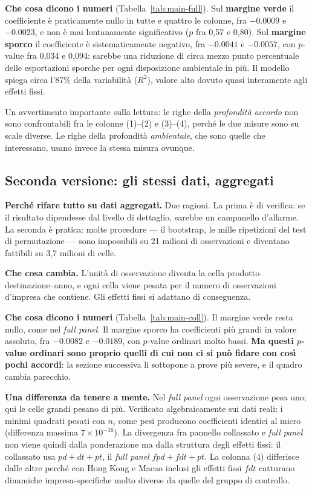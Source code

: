 \documentclass[11pt,a4paper]{article}
\begin{document}
\textbf{Che cosa dicono i numeri} (Tabella~\ref{tab:main-full}). Sul \textbf{margine verde}
il coefficiente \`e praticamente nullo in tutte e quattro le colonne, fra $-0.0009$ e
$-0.0023$, e non \`e mai lontanamente significativo ($p$ fra 0,57 e 0,80). Sul
\textbf{margine sporco} il coefficiente \`e sistematicamente negativo, fra $-0.0041$ e
$-0.0057$, con $p$-value fra 0,034 e 0,094: sarebbe una riduzione di circa mezzo punto
percentuale delle esportazioni sporche per ogni disposizione ambientale in pi\`u.
Il modello spiega circa l'87\% della variabilit\`a ($R^2$), valore alto dovuto quasi
interamente agli effetti fissi.

Un avvertimento importante sulla lettura: le righe della \emph{profondit\`a accordo} non
sono confrontabili fra le colonne (1)--(2) e (3)--(4), perch\'e le due misure sono su
scale diverse. Le righe della profondit\`a \emph{ambientale}, che sono quelle che
interessano, usano invece la stessa misura ovunque.



\clearpage
\subsection{Seconda versione: gli stessi dati, aggregati}

\textbf{Perch\'e rifare tutto su dati aggregati.} Due ragioni. La prima \`e di verifica:
se il risultato dipendesse dal livello di dettaglio, sarebbe un campanello d'allarme. La
seconda \`e pratica: molte procedure --- il bootstrap, le mille ripetizioni del test di
permutazione --- sono impossibili su 21 milioni di osservazioni e diventano fattibili su
3,7 milioni di celle.

\textbf{Che cosa cambia.} L'unit\`a di osservazione diventa la cella
prodotto--destinazione--anno, e ogni cella viene pesata per il numero di osservazioni
d'impresa che contiene. Gli effetti fissi si adattano di conseguenza.

\textbf{Che cosa dicono i numeri} (Tabella~\ref{tab:main-coll}). Il margine verde resta
nullo, come nel \emph{full panel}. Il margine sporco ha coefficienti pi\`u grandi in valore
assoluto, fra $-0.0082$ e $-0.0189$, con $p$-value ordinari molto bassi. \textbf{Ma questi
$p$-value ordinari sono proprio quelli di cui non ci si pu\`o fidare con cos\`i pochi
accordi}: la sezione successiva li sottopone a prove pi\`u severe, e il quadro cambia
parecchio.

\textbf{Una differenza da tenere a mente.} Nel \emph{full panel} ogni osservazione pesa
uno; qui le celle grandi pesano di pi\`u. Verificato algebraicamente sui dati reali: i minimi
quadrati pesati con $n_i$ come pesi producono coefficienti identici al micro (differenza massima
$7\times 10^{-16}$). La divergenza fra pannello collassato e \emph{full panel} non viene quindi
dalla ponderazione ma dalla struttura degli effetti fissi: il collassato usa $pd{+}dt{+}pt$,
il \emph{full panel} $fpd{+}fdt{+}pt$. La colonna (4) differisce dalle altre perch\'e con
Hong Kong e Macao inclusi gli effetti fissi $fdt$ catturano dinamiche impresa-specifiche molto
diverse da quelle del gruppo di controllo.
\end{document}
